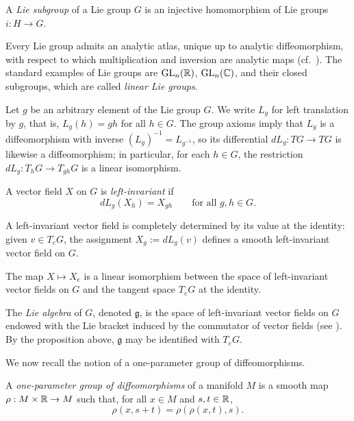 \begin{definition}
    A \emph{Lie subgroup} of a Lie group $G$ is an injective homomorphism of Lie groups $i : H \to G$.
\end{definition}

Every Lie group admits an analytic atlas, unique up to analytic diffeomorphism, with respect to which multiplication and inversion are analytic maps (cf.\ \cite[Prop.\ 1.117]{KnappAnthonyW.1996LGBa}). The standard examples of Lie groups are $\operatorname{GL}_n(\mathbb{R})$, $\operatorname{GL}_n(\mathbb{C})$, and their closed subgroups, which are called \emph{linear Lie groups}.

Let $g$ be an arbitrary element of the Lie group $G$. We write $L_g$ for left translation by $g$, that is, $L_g(h) = gh$ for all $h \in G$. The group axioms imply that $L_g$ is a diffeomorphism with inverse $(L_g)^{-1} = L_{g^{-1}}$, so its differential $dL_g : TG \to TG$ is likewise a diffeomorphism; in particular, for each $h \in G$, the restriction $dL_g : T_hG \to T_{gh}G$ is a linear isomorphism.

\begin{definition}
    A vector field $X$ on $G$ is \emph{left-invariant} if
    \[
        dL_g(X_h) = X_{gh} \qquad \text{for all } g, h \in G.
    \]
\end{definition}

A left-invariant vector field is completely determined by its value at the identity: given $v \in T_eG$, the assignment $X_g := dL_g(v)$ defines a smooth left-invariant vector field on $G$.

\begin{proposition}
    The map $X \mapsto X_e$ is a linear isomorphism between the space of left-invariant vector fields on $G$ and the tangent space $T_eG$ at the identity.
\end{proposition}

The \emph{Lie algebra} of $G$, denoted $\mathfrak{g}$, is the space of left-invariant vector fields on $G$ endowed with the Lie bracket induced by the commutator of vector fields (see \cite[Ch.\ 2, \S 3]{milneLAG}). By the proposition above, $\mathfrak{g}$ may be identified with $T_eG$.

We now recall the notion of a one-parameter group of diffeomorphisms.

\begin{definition}
    A \emph{one-parameter group of diffeomorphisms} of a manifold $M$ is a smooth map $\rho : M \times \mathbb{R} \to M$ such that, for all $x \in M$ and $s, t \in \mathbb{R}$,
    \[
        \rho(x, s+t) = \rho(\rho(x,t), s).
    \]
\end{definition}

